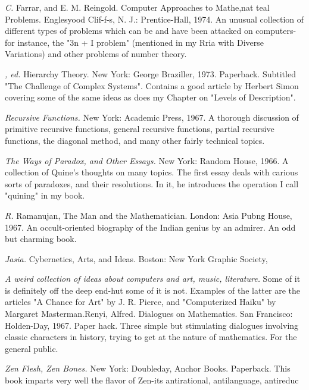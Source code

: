  {\sl C.} \llap{*\enspace}Farrar, and E. M. Reingold. Computer Approaches to Mathe,nat teal Problems. Englesyood Clif-f-s, N. J.: Prentice-Hall, 1974. An unusual collection of different types of problems which can be and have been attacked on computers-for instance, the "3n + I problem" (mentioned in my Rria with Diverse Variations) and other problems of number theory.

 {\sl , ed.} Hierarchy Theory. New York: George Braziller, 1973. Paperback. Subtitled "The Challenge of Complex Systems". Contains a good article by Herbert Simon covering some of the same ideas as does my Chapter on "Levels of Description".

 {\sl Recursive Functions.} New York: Academic Press, 1967. A thorough discussion of primitive recursive functions, general recursive functions, partial recursive functions, the diagonal method, and many other fairly technical topics.

 {\sl The Ways of Paradox, and Other Essays.} New York: Random House, 1966. A collection of Quine's thoughts on many topics. The first essay deals with carious sorts of paradoxes, and their resolutions. In it, he introduces the operation I call "quining" in my book.

 {\sl R.} Ramanujan, The Man and the Mathematician. London: Asia Pubng House, 1967. An occult-oriented biography of the Indian genius by an admirer. An odd but charming book.

 {\sl Jasia.} Cybernetics, Arts, and Ideas. Boston: New York Graphic Society,

 {\sl A weird collection of ideas about computers and art, music, literature.} Some of it is definitely off the deep end-hut some of it is not. Examples of the latter are the articles "A Chance for Art" by J. R. Pierce, and "Computerized Haiku" by Margaret Masterman.Renyi, Alfred. Dialogues on Mathematics. San Francisco: Holden-Day, 1967. Paper hack. Three simple but stimulating dialogues involving classic characters in history, trying to get at the nature of mathematics. For the general public.

 {\sl Zen Flesh, Zen Bones.} \llap{**\enspace}New York: Doubleday, Anchor Books. Paperback. This book imparts very well the flavor of Zen-its antirational, antilanguage, antireduc

